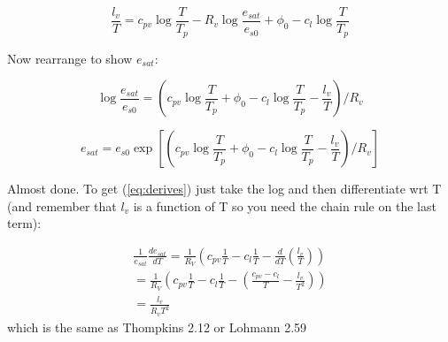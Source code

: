 \documentclass[12pt]{article}
\begin{document}
\begin{equation*}
\frac{l_v }{T}  = c_{pv} \log \frac{T }{T_p} - R_v \log \frac{ e_{sat} }{e_{s0}} + \phi_0 - c_l \log \frac{T }{T_p} 
\end{equation*}

Now rearrange to show $e_{sat}$:

\begin{equation}
\label{eq:esatlog}
\log \frac{ e_{sat} }{e_{s0}} = \left (  c_{pv} \log \frac{T }{T_p}  + \phi_0 - c_l \log \frac{T }{T_p} - \frac{l_v }{T}  \right )/R_v 
\end{equation}

\begin{equation}
\label{eq:esatfull}
e_{sat}  = e_{s0} \exp \left [ \left (  c_{pv} \log \frac{T }{T_p}  + \phi_0 - c_l \log \frac{T }{T_p} - \frac{l_v }{T}  \right )/R_v \right ]
\end{equation}

Almost done.  To get (\ref{eq:derives}) just take the log and then
differentiate wrt T (and remember that $l_v$ is a function of T
so you need the chain rule on the last term):

\begin{gather*}
\frac{1 }{e_{sat}} \frac{d e_{sat} }{dT} =  \frac{1 }{R_V} \left (   c_{pv}  \frac{1 }{T}  - c_l  \frac{1 }{T} - \frac{ d}{dT} 
\left (\frac{l_v }{T} \right )  \right ) \\
 = \frac{1 }{R_V} \left (   c_{pv}  \frac{1 }{T}  - c_l  \frac{1 }{T} - 
\left (\frac{c_{pv} - c_l }{T} - \frac{l_v }{T^2}  \right )  \right ) \\
= \frac{ l_v}{R_v T^2} 
\end{gather*}
which is the same as Thompkins 2.12 or Lohmann 2.59
\end{document}
